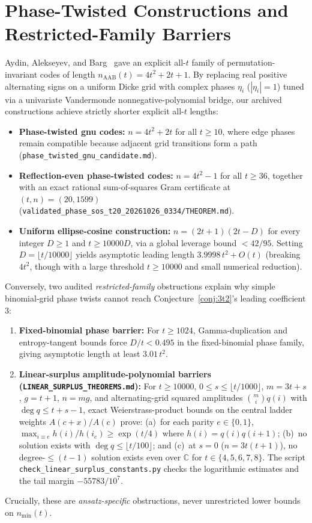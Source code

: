 \documentclass[11pt,letterpaper]{article}
\theoremstyle{definition}
\theoremstyle{remark}
\newcommand{\C}{\mathbb{C}}
\begin{document}
\section{Phase-Twisted Constructions and Restricted-Family Barriers}
Aydin, Alekseyev, and Barg~\cite{AAB2024} gave an explicit all-$t$ family of permutation-invariant codes of length $n_{\mathrm{AAB}}(t) = 4t^2 + 2t + 1$. By replacing real positive alternating signs on a uniform Dicke grid with complex phases $\eta_i$ ($|\eta_i|=1$) tuned via a univariate Vandermonde nonnegative-polynomial bridge, our archived constructions achieve strictly shorter explicit all-$t$ lengths:
\begin{itemize}
  \item \textbf{Phase-twisted gnu codes:} $n = 4t^2 + 2t$ for all $t \ge 10$, where edge phases remain compatible because adjacent grid transitions form a path (\texttt{phase\_twisted\_gnu\_candidate.md}).
  \item \textbf{Reflection-even phase-twisted codes:} $n = 4t^2 - 1$ for all $t \ge 36$, together with an exact rational sum-of-squares Gram certificate at $(t,n) = (20, 1599)$ (\texttt{validated\_phase\_sos\_t20\_20261026\_0334/THEOREM.md}).
  \item \textbf{Uniform ellipse-cosine construction:} $n = (2t+1)(2t-D)$ for every integer $D \ge 1$ and $t \ge 10000D$, via a global leverage bound $< 42/95$. Setting $D = \lfloor t/10000 \rfloor$ yields asymptotic leading length $3.9998\,t^2+O(t)$ (breaking $4t^2$, though with a large threshold $t \ge 10000$ and small numerical reduction).
\end{itemize}

Conversely, two audited \emph{restricted-family} obstructions explain why simple binomial-grid phase twists cannot reach Conjecture~\ref{conj:3t2}'s leading coefficient $3$:
\begin{enumerate}
  \item \textbf{Fixed-binomial phase barrier:} For $t \ge 1024$, Gamma-duplication and entropy-tangent bounds force $D/t < 0.495$ in the fixed-binomial phase family, giving asymptotic length at least $3.01\,t^2$.
  \item \textbf{Linear-surplus amplitude-polynomial barriers (\texttt{LINEAR\_SURPLUS\_THEOREMS.md}):} For $t \ge 10000$, $0 \le s \le \lfloor t/1000\rfloor$, $m=3t+s$, $g=t+1$, $n=mg$, and alternating-grid squared amplitudes $\binom{m}{i}q(i)$ with $\deg q \le t+s-1$, exact Weierstrass-product bounds on the central ladder weights $A(c+x)/A(c)$ prove: (a)~for each parity $e \in \{0,1\}$, $\max_{i \equiv e} h(i)/h(i_e) \ge \exp(t/4)$ where $h(i)=q(i)q(i+1)$; (b)~no solution exists with $\deg q \le \lfloor t/100\rfloor$; and (c)~at $s=0$ ($n=3t(t+1)$), no degree-$\le(t-1)$ solution exists even over $\C$ for $t \in \{4,5,6,7,8\}$. The script \nolinkurl{check_linear_surplus_constants.py} checks the logarithmic estimates and the tail margin $-55783/10^7$.
\end{enumerate}
Crucially, these are \emph{ansatz-specific} obstructions, never unrestricted lower bounds on $n_{\min}(t)$.
\end{document}
